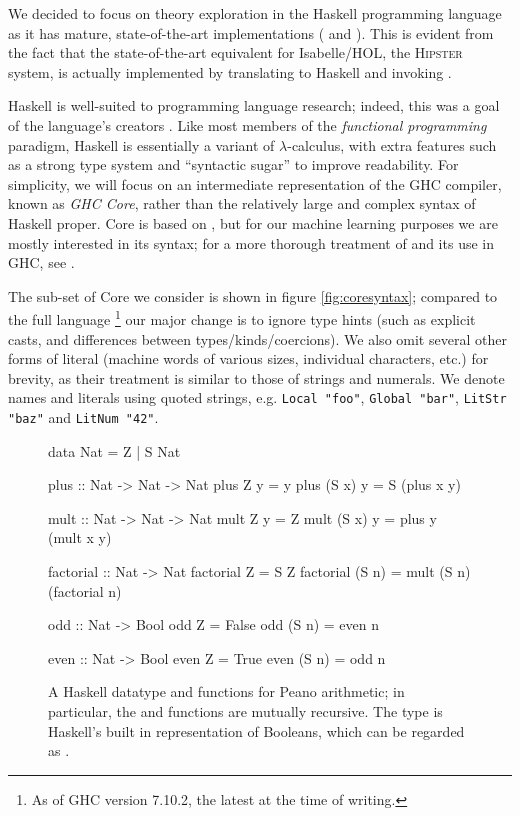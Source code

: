 We decided to focus on theory exploration in the Haskell programming language as it has mature, state-of-the-art implementations (\qspec{} \citep{QuickSpec} and \hspec{} \citep{claessen2013automating}). This is evident from the fact that the state-of-the-art equivalent for Isabelle/HOL, the \textsc{Hipster} \citep{Hipster} system, is actually implemented by translating to Haskell and invoking \hspec{}.

Haskell is well-suited to programming language research; indeed, this was a goal of the language's creators \citep{marlow2010haskell}. Like most members of the \emph{functional programming} paradigm, Haskell is essentially a variant of $\lambda$-calculus, with extra features such as a strong type system and ``syntactic sugar'' to improve readability. For simplicity, we will focus on an intermediate representation of the \textsc{GHC} compiler, known as \emph{GHC Core}, rather than the relatively large and complex syntax of Haskell proper. Core is based on \fc{}, but for our machine learning purposes we are mostly interested in its syntax; for a more thorough treatment of \fc{} and its use in GHC, see \citep[Appendix C]{sulzmann2007system}.

The sub-set of Core we consider is shown in figure \ref{fig:coresyntax}; compared to the full language \footnote{As of GHC version 7.10.2, the latest at the time of writing.} our major change is to ignore type hints (such as explicit casts, and differences between types/kinds/coercions). We also omit several other forms of literal (machine words of various sizes, individual characters, etc.) for brevity, as their treatment is similar to those of strings and numerals. We denote names and literals using quoted strings, e.g. \texttt{Local "foo"}, \texttt{Global "bar"}, \texttt{LitStr "baz"} and \texttt{LitNum "42"}.

\begin{figure}
  \begin{haskell}
    data Nat = Z
             | S Nat

    plus :: Nat -> Nat -> Nat
    plus    Z  y = y
    plus (S x) y = S (plus x y)

    mult :: Nat -> Nat -> Nat
    mult    Z  y = Z
    mult (S x) y = plus y (mult x y)

    factorial :: Nat -> Nat
    factorial    Z  = S Z
    factorial (S n) = mult (S n) (factorial n)

    odd :: Nat -> Bool
    odd    Z  = False
    odd (S n) = even n

    even :: Nat -> Bool
    even    Z  = True
    even (S n) = odd n
  \end{haskell}
  \caption{A Haskell datatype and functions for Peano arithmetic; in particular, the  and  functions are mutually recursive. The  type is Haskell's built in representation of Booleans, which can be regarded as .}
  \label{fig:haskellexample}
\end{figure}

